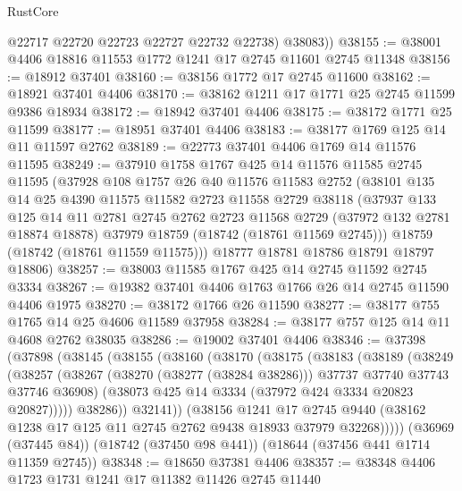 \begin{lexlean}{RustCore}
\begin{coremodule}
          @22717
          @22720
          @22723
          @22727
          @22732
          @22738)
        @38083))
@38155 := @38001 @4406 @18816 @11553 @1772 @1241 @17 @2745 @11601 @2745 @11348
@38156 := @18912 @37401
@38160 := @38156 @1772 @17 @2745 @11600
@38162 := @18921 @37401 @4406
@38170 := @38162 @1211 @17 @1771 @25 @2745 @11599 @9386 @18934
@38172 := @18942 @37401 @4406
@38175 := @38172 @1771 @25 @11599
@38177 := @18951 @37401 @4406
@38183 := @38177 @1769 @125 @14 @11 @11597 @2762
@38189 := @22773 @37401 @4406 @1769 @14 @11576 @11595
@38249 := @37910
    @1758
    @1767
    @425
    @14
    @11576
    @11585
    @2745
    @11595
    (@37928
      @108
      @1757
      @26
      @40
      @11576
      @11583
      @2752
      (@38101
        @135
        @14
        @25
        @4390
        @11575
        @11582
        @2723
        @11558
        @2729
        @38118
        (@37937
          @133
          @125
          @14
          @11
          @2781
          @2745
          @2762
          @2723
          @11568
          @2729
          (@37972 @132 @2781 @18874 @18878)
          @37979
          @18759
          (@18742 (@18761 @11569 @2745)))
        @18759
        (@18742 (@18761 @11559 @11575)))
      @18777
      @18781
      @18786
      @18791
      @18797
      @18806)
@38257 := @38003 @11585 @1767 @425 @14 @2745 @11592 @2745 @3334
@38267 := @19382 @37401 @4406 @1763 @1766 @26 @14 @2745 @11590 @4406 @1975
@38270 := @38172 @1766 @26 @11590
@38277 := @38177 @755 @1765 @14 @25 @4606 @11589 @37958
@38284 := @38177 @757 @125 @14 @11 @4608 @2762 @38035
@38286 := @19002 @37401 @4406
@38346 := @37398
    (@37898
      (@38145
        (@38155
          (@38160
            (@38170
              (@38175
                (@38183
                  (@38189
                    (@38249
                      (@38257
                        (@38267
                          (@38270 (@38277 (@38284 @38286)))
                          @37737
                          @37740
                          @37743
                          @37746
                          @36908)
                        (@38073 @425 @14 @3334 (@37972 @424 @3334 @20823 @20827)))))
                  @38286))
              @32141))
          (@38156
            @1241
            @17
            @2745
            @9440
            (@38162 @1238 @17 @125 @11 @2745 @2762 @9438 @18933 @37979 @32268)))))
    (@36969 (@37445 @84))
    (@18742 (@37450 @98 @441))
    (@18644 (@37456 @441 @1714 @11359 @2745))
@38348 := @18650 @37381 @4406
@38357 := @38348 @4406 @1723 @1731 @1241 @17 @11382 @11426 @2745 @11440

\end{coremodule}
\end{lexlean}
